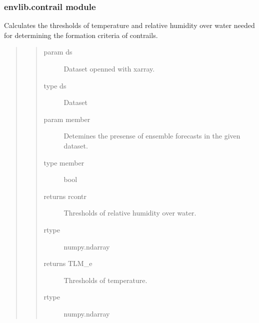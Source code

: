 \documentclass[a4paper,11pt,english]{sphinxmanual}
\begin{document}
\subsubsection{envlib.contrail module}
\label{\detokenize{envlib:module-envlib.contrail}}\label{\detokenize{envlib:envlib-contrail-module}}

\begin{fulllineitems}
\label{\detokenize{envlib:envlib.contrail.get_cont_form_thr}}
Calculates the thresholds of temperature and relative humidity over water needed for determining the
formation criteria of contrails.
\begin{quote}
\begin{quote}\begin{description}
\item[{param ds}] \leavevmode
Dataset openned with xarray.

\item[{type ds}] \leavevmode
Dataset

\item[{param member}] \leavevmode
Detemines the presense of ensemble forecasts in the given dataset.

\item[{type member}] \leavevmode
bool

\item[{returns rcontr}] \leavevmode
Thresholds of relative humidity over water.

\item[{rtype}] \leavevmode
numpy.ndarray

\item[{returns TLM\_e}] \leavevmode
Thresholds of temperature.

\item[{rtype}] \leavevmode
numpy.ndarray

\end{description}\end{quote}
\end{quote}

\end{fulllineitems}
\end{document}

